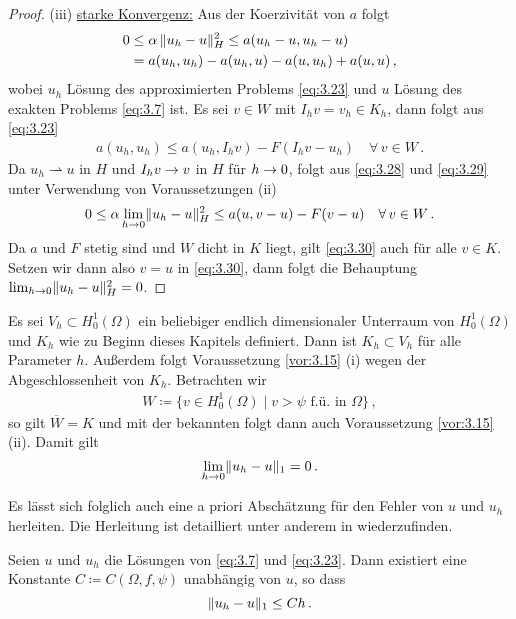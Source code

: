 \begin{proof}
(iii) \underline{starke Konvergenz:} Aus der Koerzivität von $a$ folgt
\begin{align}\label{eq:3.28}
	\begin{aligned}
		0 &\le \alpha \, \lVert u_h-u\rVert_H^2 \le a(u_h-u,u_h-u) \\
		& = a(u_h,u_h)-a(u_h,u)-a(u,u_h)+a(u,u) \, ,
	\end{aligned}
\end{align}
wobei $u_h$ Lösung des approximierten Problems \eqref{eq:3.23} und $u$ Lösung des exakten Problems \eqref{eq:3.7} ist. Es sei $v \in W$ mit $I_h v = v_h \in K_h$, dann folgt aus \eqref{eq:3.23}
\begin{align}\label{eq:3.29}
	a(u_h,u_h) \le a(u_h,I_h v) - F(I_h v-u_h) \quad \forall \, v \in W \, .
\end{align}
Da $u_h \rightharpoonup u$ in $H$ und $I_h v \rightarrow v$ in $H$ für $h \rightarrow 0$, folgt aus \eqref{eq:3.28} und \eqref{eq:3.29} unter Verwendung von Voraussetzungen (ii)
\begin{align}\label{eq:3.30}
	0 \le \alpha \lim_{h\rightarrow 0} \lVert u_h-u\rVert^2_H \le a(u,v-u)-F(v-u) \quad \forall \, v \in W \, .
\end{align}
Da $a$ und $F$ stetig sind und $W$ dicht in $K$ liegt, gilt \eqref{eq:3.30} auch für alle $v \in K$. Setzen wir dann also $v = u$ in \eqref{eq:3.30}, dann folgt die Behauptung $\lim_{h\rightarrow 0} \lVert u_h - u \rVert_H^2 = 0$. 
\end{proof}


Es sei $V_h \subset H^1_0(\Omega)$ ein beliebiger endlich dimensionaler Unterraum von $H^1_0(\Omega)$ und $K_h$ wie zu Beginn dieses Kapitels definiert. Dann ist $K_h \subset V_h$ für alle Parameter $h$. Außerdem folgt Voraussetzung \ref{vor:3.15} (i) wegen der Abgeschlossenheit von $K_h$. Betrachten wir
\begin{align*}
	W \coloneqq \{v \in H^1_0(\Omega) \mid v > \psi \text{ f.ü. in } \Omega\} \, ,
\end{align*}
so gilt $\overline W = K$ und mit der bekannten  folgt dann auch Voraussetzung \ref{vor:3.15} (ii). Damit gilt
\[
	\lim_{h\rightarrow 0} \lVert u_h-u\rVert_1 = 0\, .
\]


Es lässt sich folglich auch eine a priori Abschätzung für den Fehler von $u$ und $u_h$ herleiten. Die Herleitung ist detailliert unter anderem in \cite{Falk} wiederzufinden.


\begin{theorem}\label{theorem:3.17}
Seien $u$ und $u_h$ die Lösungen von \eqref{eq:3.7} und \eqref{eq:3.23}. Dann existiert eine Konstante $C \coloneqq C(\Omega, f, \psi)$ unabhängig von $u$, so dass
\[
	\lVert u_h-u\rVert_1 \le C h \, .
\]
\end{theorem}

